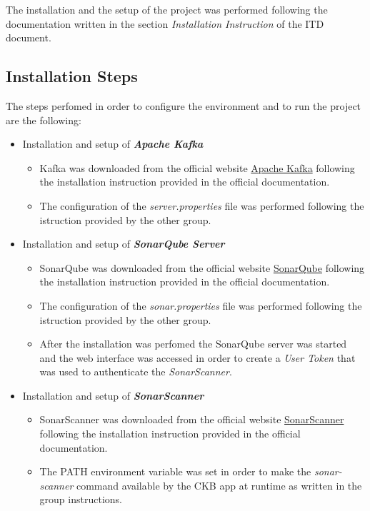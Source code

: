 The installation and the setup of the project was performed following the documentation written in the section \textit{Installation Instruction} of the ITD document.
\subsection{Installation Steps}
The steps perfomed in order to configure the environment and to run the project are the following:
\begin{itemize}
        \item Installation and setup of \textbf{\textit{Apache Kafka}}
        \begin{itemize}
            \item Kafka was downloaded from the official website \href{https://kafka.apache.org/downloads}{Apache Kafka} following the installation instruction provided in the official documentation.
            \item The configuration of the \textit{server.properties} file was performed following the istruction provided by the other group.
        \end{itemize}
        \item Installation and setup of \textbf{\textit{SonarQube Server}}
        \begin{itemize}
            \item SonarQube was downloaded from the official website \href{https://www.sonarqube.org/downloads/}{SonarQube} following the installation instruction provided in the official documentation.
            \item The configuration of the \textit{sonar.properties} file was performed following the istruction provided by the other group.
            \item After the installation was perfomed the SonarQube server was started and the web interface was accessed in order to create a \textit{User Token} that was used to authenticate the \textit{SonarScanner}.
        \end{itemize}
        \item Installation and setup of \textbf{\textit{SonarScanner}}
        \begin{itemize}
            \item SonarScanner was downloaded from the official website \href{https://docs.sonarqube.org/latest/analysis/scan/sonarscanner/}{SonarScanner} following the installation instruction provided in the official documentation.
            \item The PATH environment variable was set in order to make the \textit{sonar-scanner} command available by the CKB app at runtime as written in the group instructions.

\end{itemize}
\end{itemize}
